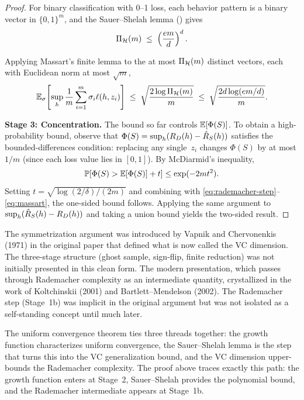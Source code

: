 \begin{proof}
For binary classification with 0--1 loss, each behavior pattern is a
binary vector in $\{0,1\}^m$, and the Sauer--Shelah lemma
() gives
\begin{equation}
\label{eq:sauer-shelah-app}
  \Pi_\mathcal{H}(m) \;\leq\; \left(\frac{em}{d}\right)^d.
\end{equation}

Applying Massart's finite lemma to the at most $\Pi_\mathcal{H}(m)$
distinct vectors, each with Euclidean norm at most
$\sqrt{m}$,
\begin{equation}
\label{eq:massart}
  \mathbb{E}_\sigma\!\left[\sup_{h} \frac{1}{m}\sum_{i=1}^m \sigma_i \ell(h,z_i)
  \right]
  \;\leq\; \sqrt{\frac{2\log \Pi_\mathcal{H}(m)}{m}}
  \;\leq\; \sqrt{\frac{2d\log(em/d)}{m}}.
\end{equation}

\textbf{Stage 3: Concentration.}
The bound so far controls $\mathbb{E}[\Phi(S)]$.  To obtain a high-probability
bound, observe that $\Phi(S) = \sup_h (R_D(h) - \hat{R}_S(h))$
satisfies the bounded-differences condition: replacing any single~$z_i$
changes $\Phi(S)$ by at most $1/m$ (since each loss value lies in
$[0,1]$).  By McDiarmid's inequality,
\[
  \mathbb{P}\!\left[\Phi(S) > \mathbb{E}[\Phi(S)] + t\right]
  \leq \exp(-2mt^2).
\]
Setting $t = \sqrt{\log(2/\delta)/(2m)}$ and combining with
\eqref{eq:rademacher-step}--\eqref{eq:massart}, the one-sided bound
follows.  Applying the same argument to
$\sup_h (\hat{R}_S(h) - R_D(h))$ and taking a union bound yields
the two-sided result.
\end{proof}

\begin{historical}
The symmetrization argument was introduced by Vapnik and Chervonenkis
(1971) in the original paper that defined what is now called the VC
dimension.  The three-stage structure (ghost sample, sign-flip,
finite reduction) was not initially presented in this clean form.  The
modern presentation, which passes through Rademacher complexity as an
intermediate quantity, crystallized in the work of Koltchinskii (2001)
and Bartlett--Mendelson (2002).  The Rademacher step (Stage~1b) was
implicit in the original argument but was not isolated as a self-standing
concept until much later.
\end{historical}

\begin{traversal}
The uniform convergence theorem ties three threads together: the growth
function characterizes uniform convergence, the Sauer--Shelah lemma is the
step that turns this into the VC generalization bound, and the VC dimension
upper-bounds the Rademacher complexity.  The proof above traces exactly this
path: the growth function enters at Stage~2, Sauer--Shelah provides the
polynomial bound, and the Rademacher intermediate appears at Stage~1b.
\end{traversal}


